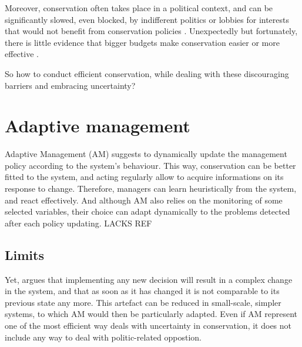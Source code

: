 \documentclass[12pt,a4paper]{article}
\begin{document}
Moreover, conservation often takes place in a political context, and can be significantly slowed, even blocked, by indifferent politics or lobbies for interests that would not benefit from conservation policies \citep{keith2011uncertainty}.
Unexpectedly but fortunately, there is little evidence that bigger budgets make conservation easier or more effective \citep{game2013conservation}.

So how to conduct efficient conservation, while dealing with these discouraging barriers and embracing uncertainty?

\section{Adaptive management}
%

Adaptive Management (AM) suggests to dynamically update the management policy according to the system's behaviour.
This way, conservation can be better fitted to the system, and acting regularly allow to acquire informations on its response to change.
Therefore, managers can learn heuristically from the system, and react effectively.
And although AM also relies on the monitoring of some selected variables, their choice can adapt dynamically to the problems detected after each policy updating.
LACKS REF

\subsection{Limits}

Yet, \cite{game2013conservation} argues that implementing any new decision will result in a complex change in the system, and that as soon as it has changed it is not comparable to its previous state any more.
This artefact can be reduced in small-scale, simpler systems, to which AM would then be particularly adapted.
%
Even if AM represent one of the most efficient way deals with uncertainty in conservation, it does not include any way to deal with politic-related oppostion.
\end{document}

